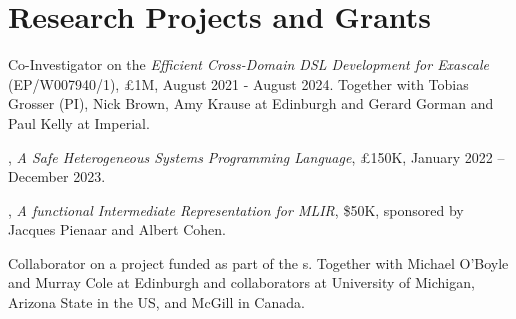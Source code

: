 \section{Research Projects and Grants}
\begin{cvitemize}
    \item Co-Investigator on the  \emph{Efficient Cross-Domain DSL Development for Exascale} (EP/W007940/1), £1M, August 2021 - August 2024.
    Together with Tobias Grosser (PI), Nick Brown, Amy Krause at Edinburgh and Gerard Gorman and Paul Kelly at Imperial.
    \item {}, \textit{A Safe Heterogeneous Systems Programming Language}, £150K, January 2022 -- December 2023.%
    \item {}, \textit{A functional Intermediate Representation for MLIR}, \$50K, sponsored by Jacques Pienaar and Albert Cohen.%
    \item Collaborator on a project funded as part of the s.
    Together with Michael O'Boyle and Murray Cole at Edinburgh and collaborators at University of Michigan, Arizona State in the US, and McGill in Canada.
\end{cvitemize}